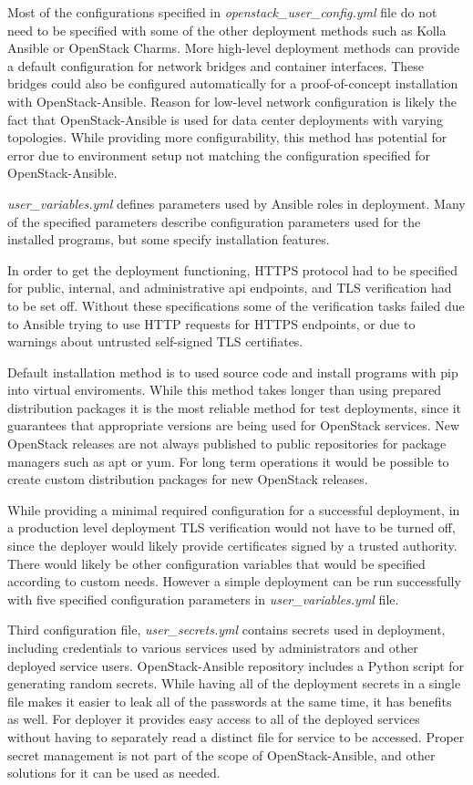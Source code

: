 \documentclass[officiallayout]{tktla}
\begin{document}
Most of the configurations specified in \textit{openstack\_user\_config.yml}
file do not need to be specified with some of the other deployment methods such
as Kolla Ansible or OpenStack Charms. More high-level deployment methods can
provide a default configuration for network bridges and container interfaces.
These bridges could also be configured automatically for a proof-of-concept
installation with OpenStack-Ansible. Reason for low-level network configuration
is likely the fact that OpenStack-Ansible is used for data center deployments
with varying topologies. While providing more configurability, this method has
potential for error due to environment setup not matching the configuration
specified for OpenStack-Ansible.

\textit{user\_variables.yml} defines parameters used by Ansible roles in
deployment. Many of the specified parameters describe configuration parameters
used for the installed programs, but some specify installation features.

In order to get the deployment functioning, HTTPS protocol had to be specified
for public, internal, and administrative api endpoints, and TLS verification
had to be set off. Without these specifications some of the verification tasks
failed due to Ansible trying to use HTTP requests for HTTPS endpoints, or due
to warnings about untrusted self-signed TLS certifiates.

Default installation method is to used source code and install programs with
pip into virtual enviroments. While this method takes longer than using
prepared distribution packages it is the most reliable method for test
deployments, since it guarantees that appropriate versions are being used for
OpenStack services. New OpenStack releases are not always published to public
repositories for package managers such as apt or yum. For long term operations
it would be possible to create custom distribution packages for new OpenStack
releases.

While providing a minimal required configuration for a successful deployment,
in a production level deployment TLS verification would not have to be turned
off, since the deployer would likely provide certificates signed by a trusted
authority. There would likely be other configuration variables that would be
specified according to custom needs. However a simple deployment can be run
successfully with five specified configuration parameters in
\textit{user\_variables.yml} file.

Third configuration file, \textit{user\_secrets.yml} contains secrets used in
deployment, including credentials to various services used by administrators
and other deployed service users. OpenStack-Ansible repository includes a
Python script for generating random secrets. While having all of the deployment
secrets in a single file makes it easier to leak all of the passwords at the
same time, it has benefits as well. For deployer it provides easy access to all
of the deployed services without having to separately read a distinct file for
service to be accessed. Proper secret management is not part of the scope of
OpenStack-Ansible, and other solutions for it can be used as needed.
\end{document}
